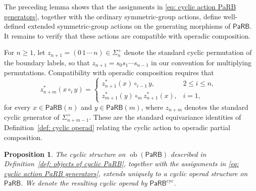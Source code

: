 \documentclass{amsart}
\newcommand{\PaRB}{\mathsf{PaRB}}
\newcommand{\ob}{\operatorname{ob}}
\newtheorem{prop}[theorem]{Proposition}%
\theoremstyle{definition}
\numberwithin{equation}{section}
\begin{document}
The preceding lemma shows that the assignments in
\eqref{eq: cyclic action PaRB generators}, together with the ordinary
symmetric-group actions, define well-defined extended symmetric-group
actions on the generating morphisms of $\PaRB$. It remains to verify
that these actions are compatible with operadic composition.

For $n \geq 1$, let $z_{n+1} = (0\,1\,\cdots\,n) \in \Sigma_n^+$ denote the standard cyclic permutation of the boundary labels, so that $z_{n+1} = s_0 s_1 \cdots s_{n-1}$ in our convention for multiplying permutations. Compatibility with operadic composition requires that
\begin{equation}
\label{eq: cyclic compatibility PaRB}
z_{n+m}^*(x \circ_i y) =
\begin{cases}
z_{n+1}^*(x) \circ_{i-1} y, & 2 \leq i \leq n,\\[3pt]
z_{m+1}^*(y) \circ_m z_{n+1}^*(x), & i = 1,
\end{cases}
\end{equation}
for every $x \in \PaRB(n)$ and $y \in \PaRB(m)$, where $z_{n+m}$ denotes the standard cyclic generator of $\Sigma_{n+m-1}^+$. These are the standard equivariance identities of Definition~\ref{def: cyclic operad} relating the cyclic action to operadic partial composition. %

\begin{prop}
\label{prop: cyclic structure on PaRB}
The cyclic structure on $\ob(\PaRB)$ described in Definition~\ref{def: objects of cyclic PaRB}, together with the assignments in \eqref{eq: cyclic action PaRB generators}, extends uniquely to a cyclic operad structure on $\PaRB$. We denote the resulting cyclic operad by $\PaRB^{\mathrm{cyc}}$.
\end{prop}
\end{document}
